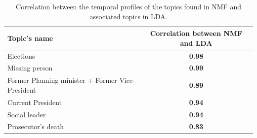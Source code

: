 \documentclass{bmcart}
\begin{document}
\begin{backmatter}
\begin{table}[h!]
\caption{Correlation between the temporal profiles of the topics found in NMF and associated topics in LDA.}
\begin{tabular}{lc}
Topic's name & Correlation between NMF and LDA \\ \hline
Elections & \textbf{0.98} \\
Missing person & \textbf{0.99} \\
Former Planning minister + Former Vice-President & \textbf{0.89} \\
Current President & \textbf{0.94} \\
Social leader & \textbf{0.94} \\
Prosecutor's death & \textbf{0.83} \\
\end{tabular}
\label{table:correlation_nmf_lda}
\end{table}






\end{backmatter}
\end{document}
